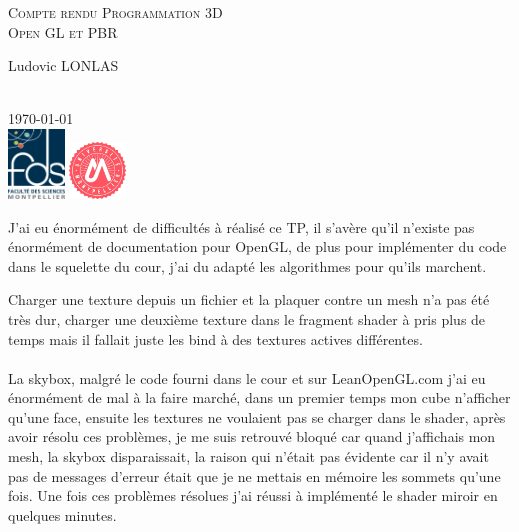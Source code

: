 \documentclass[12pt]{report}
\begin{document}
\begin{titlepage}

\newcommand{\HRule}{\rule{\linewidth}{0.5mm}} %

\center 

\textsc{\LARGE Compte rendu Programmation 3D}\\[1.5cm]
\textsc{\Large Open GL et PBR}\\[0.5cm] 


\begin{minipage}{0.4\textwidth}
\begin{flushleft} \large
\center
Ludovic \textsc{LONLAS}\\ %
\end{flushleft}

\end{minipage}\\[2cm]

{\large \today}\\[2cm]

\includegraphics[width=1.5cm]{Logo_FDS_Quadri_Grand_2392x2950-243x300.png}
\includegraphics[width=1.5cm]{LOGO_RVB_grand-UM.jpg}\\[1cm]
\end{titlepage}



J'ai eu énormément de difficultés à réalisé ce TP, il s'avère qu'il n'existe pas énormément de documentation pour OpenGL, de plus pour implémenter du code dans le squelette du cour, j'ai du adapté les algorithmes pour qu'ils marchent.

Charger une texture depuis un fichier et la plaquer contre un mesh n'a pas été très dur, charger une deuxième texture dans le fragment shader à pris plus de temps mais il fallait juste les bind à des textures actives différentes.
\\\\
La skybox,
malgré le code fourni dans le cour et sur LeanOpenGL.com j'ai eu énormément de mal à la  faire marché, dans un premier temps mon cube n'afficher qu'une face, ensuite les textures ne voulaient pas se charger dans le shader, après avoir résolu ces problèmes, je me suis retrouvé bloqué car quand j'affichais mon mesh, la skybox disparaissait, la raison qui n'était pas évidente car il n'y avait pas de messages d'erreur était que je ne mettais en mémoire les sommets qu'une fois.
Une fois ces problèmes résolues j'ai réussi à implémenté le shader miroir en quelques minutes.
\end{document}
